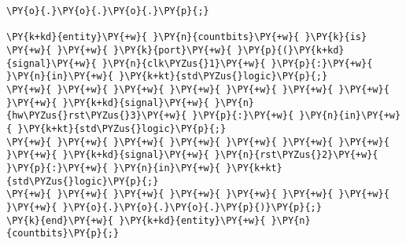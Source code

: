 \begin{Verbatim}[commandchars=\\\{\}]
\PY{o}{.}\PY{o}{.}\PY{o}{.}\PY{p}{;}

\PY{k+kd}{entity}\PY{+w}{ }\PY{n}{countbits}\PY{+w}{ }\PY{k}{is}
\PY{+w}{ }\PY{+w}{ }\PY{k}{port}\PY{+w}{ }\PY{p}{(}\PY{k+kd}{signal}\PY{+w}{ }\PY{n}{clk\PYZus{}1}\PY{+w}{ }\PY{p}{:}\PY{+w}{ }\PY{n}{in}\PY{+w}{ }\PY{k+kt}{std\PYZus{}logic}\PY{p}{;}
\PY{+w}{ }\PY{+w}{ }\PY{+w}{ }\PY{+w}{ }\PY{+w}{ }\PY{+w}{ }\PY{+w}{ }\PY{+w}{ }\PY{k+kd}{signal}\PY{+w}{ }\PY{n}{hw\PYZus{}rst\PYZus{}3}\PY{+w}{ }\PY{p}{:}\PY{+w}{ }\PY{n}{in}\PY{+w}{ }\PY{k+kt}{std\PYZus{}logic}\PY{p}{;}
\PY{+w}{ }\PY{+w}{ }\PY{+w}{ }\PY{+w}{ }\PY{+w}{ }\PY{+w}{ }\PY{+w}{ }\PY{+w}{ }\PY{k+kd}{signal}\PY{+w}{ }\PY{n}{rst\PYZus{}2}\PY{+w}{ }\PY{p}{:}\PY{+w}{ }\PY{n}{in}\PY{+w}{ }\PY{k+kt}{std\PYZus{}logic}\PY{p}{;}
\PY{+w}{ }\PY{+w}{ }\PY{+w}{ }\PY{+w}{ }\PY{+w}{ }\PY{+w}{ }\PY{+w}{ }\PY{+w}{ }\PY{o}{.}\PY{o}{.}\PY{o}{.}\PY{p}{)}\PY{p}{;}
\PY{k}{end}\PY{+w}{ }\PY{k+kd}{entity}\PY{+w}{ }\PY{n}{countbits}\PY{p}{;}


\end{Verbatim}

